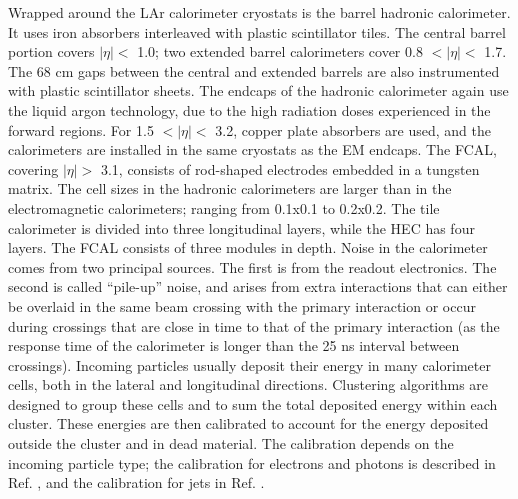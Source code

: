 Wrapped around the LAr calorimeter cryostats is the barrel hadronic calorimeter. It uses iron absorbers interleaved with plastic scintillator tiles. 
The central barrel portion covers $ |\eta| < $ 1.0; two extended barrel calorimeters cover 0.8 $ < |\eta| < $ 1.7. The 68 cm gaps between the central and extended barrels are also instrumented with plastic scintillator sheets. The endcaps of the hadronic calorimeter again use the liquid argon technology, due to the high radiation doses experienced in the forward regions. 
For 1.5 $ < |\eta| < $ 3.2, copper plate absorbers are used, and the calorimeters are installed in the same cryostats as the EM endcaps. 
The FCAL, covering $ |\eta| > $ 3.1, consists of rod-shaped electrodes embedded in a tungsten matrix. The cell sizes in the hadronic calorimeters are larger than in the electromagnetic calorimeters; ranging from 0.1x0.1 to 0.2x0.2. The tile calorimeter is divided into three longitudinal layers, while the HEC has four layers. The FCAL consists of three modules in depth. 
Noise in the calorimeter comes from two principal sources. The first is from the readout electronics. The second is called “pile-up” noise, and arises from extra interactions that can either be overlaid in the same beam crossing with the primary interaction or occur during crossings that are close in time to that of the primary interaction (as the response time of the calorimeter is longer than the 25 ns interval between crossings). 
Incoming particles usually deposit their energy in many calorimeter cells, both in the lateral and longitudinal directions. Clustering algorithms are designed to group these cells and to sum the total deposited energy within each cluster. These energies are then calibrated to account for the energy deposited outside the cluster and in dead material. The calibration depends on the incoming particle type; the calibration for electrons and photons is described in Ref. , and the calibration for jets in Ref. .

